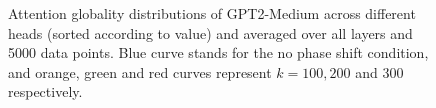 \documentclass[letterpaper, 12pt]{report}
\begin{document}
\begin{figure}
    \centering
    \caption{Attention globality distributions of GPT2-Medium across different heads (sorted according to value) and averaged over all layers and 5000 data points. Blue curve stands for the no phase shift condition, and orange, green and red curves represent $k=100,200$ and $300$ respectively.}
    \label{fig:globality_GPT2-medium}
\end{figure}
\end{document}
